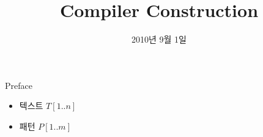 \documentclass[10pt]{beamer}
\title{Compiler Construction}
\date{2010년 9월 1일}
\begin{document}
\begin{frame}
  \maketitle
\end{frame}

\begin{frame}{Preface}
  

\end{frame}



\begin{itemize}{약속}
  \item 텍스트 $T[1..n]$ 
  \item 패턴 $P[1..m]$
\end{itemize}











\begin{frame}
  \tableofcontents
\end{frame}
\end{document}
